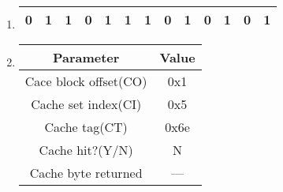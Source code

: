 \documentclass{article}
\begin{document}
\begin{enumerate}[label=\textbf{\Alph*.}]
	\item 
\begin{tabular}{|c|c|c|c|c|c|c|c|c|c|c|c|c|}
	\hline
	0&1&1&0&1&1&1&0&1&0&1&0&1 \\
	\hline
\end{tabular}
	\item
	\begin{tabular}{c c}
		Parameter & Value \\
		\hline
		Cace block offset(CO) & 0x1 \\
		Cache set index(CI) & 0x5 \\
		Cache tag(CT) & 0x6e \\
		Cache hit?(Y/N) & N \\
		Cache byte returned & --- \\
	\end{tabular}
\end{enumerate}
\end{document}
